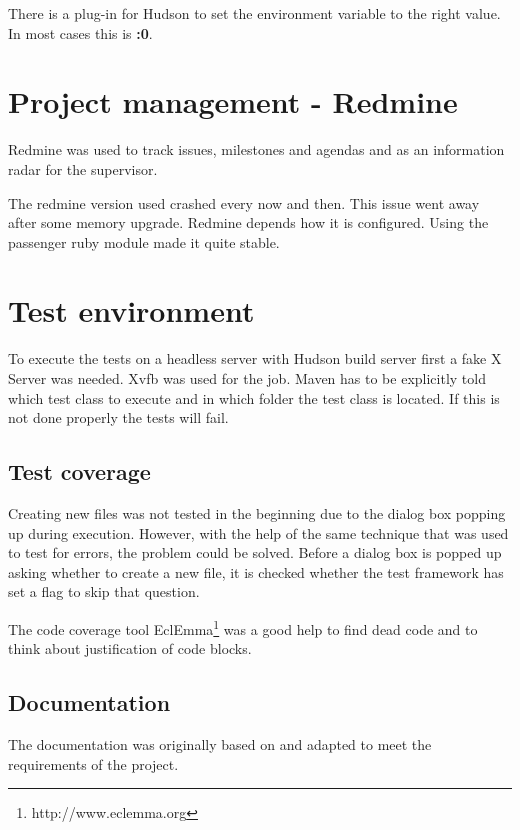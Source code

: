 There is a plug-in for Hudson to set the environment variable to
the right value. In most cases this is \textbf{:0}.

\section{Project management - Redmine}

Redmine was used to track issues, milestones and agendas and as an information 
radar for the supervisor.

The redmine version used crashed every now and then. This issue went away after
some memory upgrade. Redmine depends how it is configured. Using the passenger
ruby module made it quite stable. 

\section{Test environment}

To execute the tests on a headless server with Hudson build server first a fake
X Server was needed. Xvfb was used for the job. Maven has to be
explicitly told which test class to execute and in which folder the test class
is located. If this is not done properly the tests will fail.

\subsection{Test coverage}

Creating new files was not tested in the beginning due to the dialog box popping 
up during execution. However, with the help of the same technique that was used 
to test for errors, the problem could be solved. Before a dialog box is popped 
up asking whether to create a new file, it is checked whether the test framework 
has set a flag to skip that question.

The code coverage tool EclEmma\footnote{http://www.eclemma.org} was a good help 
to find dead code and to think about justification of code blocks. 

\subsection{Documentation}

The documentation was originally based on \cite{AV08} and adapted to meet the 
requirements of the project.

